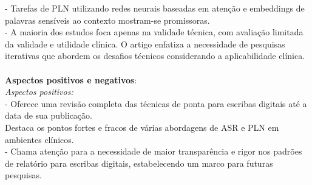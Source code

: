 \documentclass[
	article,
	11pt,
	oneside,
	a4paper,
	english,
	brazil,
	sumario=tradicional
	]{abntex2}
\begin{document}
\begin{enumerate}
- Tarefas de PLN utilizando redes neurais baseadas em atenção e embeddings de palavras sensíveis ao contexto mostram-se promissoras.\\
- A maioria dos estudos foca apenas na validade técnica, com avaliação limitada da validade e utilidade clínica. O artigo enfatiza a necessidade de pesquisas iterativas que abordem os desafios técnicos considerando a aplicabilidade clínica.\\
\\
\textbf{Aspectos positivos e negativos}:\\
\textit{Aspectos positivos:} \\
- Oferece uma revisão completa das técnicas de ponta para escribas digitais até a data de sua publicação.\\
Destaca os pontos fortes e fracos de várias abordagens de ASR e PLN em ambientes clínicos.\\
- Chama atenção para a necessidade de maior transparência e rigor nos padrões de relatório para escribas digitais, estabelecendo um marco para futuras pesquisas.


\end{enumerate}
\end{document}
